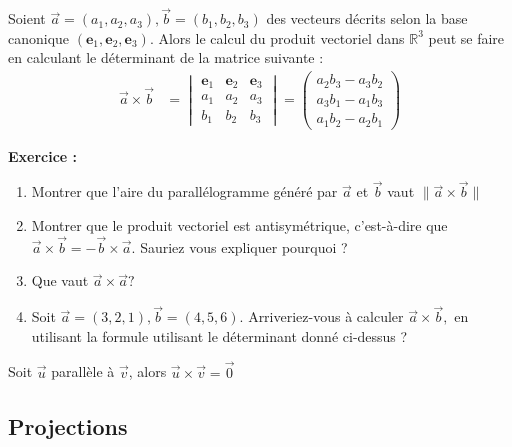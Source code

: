 \documentclass{article}
\begin{document}
\begin{tcolorbox}[title = Calcul du produit vectoriel, enlarge top by=1mm, enlarge bottom by=1mm]
Soient $\Vec{a}=(a_1,a_2,a_3),\Vec{b}=(b_1,b_2,b_3)$ des vecteurs décrits selon la base canonique $(\mathbf{e}_1,\mathbf{e}_2,\mathbf{e}_3).$ Alors le calcul du produit vectoriel dans $\mathbb{R}^3$ peut se faire en calculant le déterminant de la matrice suivante :\begin{align*}
    \vec{a} \times \vec{b}& = \begin{vmatrix}\mathbf{e}_1 & \mathbf{e}_2 & \mathbf{e}_3\\
a_1 & a_2 & a_3\\
b_1 & b_2 & b_3\end{vmatrix}=\begin{pmatrix}
a_2 b_3 - a_3 b_2 \\
a_3 b_1 - a_1 b_3 \\
a_1 b_2 - a_2 b_1
\end{pmatrix}
\end{align*}
 
\end{tcolorbox}


\textbf{Exercice :} 
\begin{enumerate}
    \item Montrer que l'aire du parallélogramme généré par $\vec{a}$ et $\vec{b}$ vaut $\lVert \vec{a} \times \vec{b} \rVert$
    \item Montrer que le produit vectoriel est antisymétrique, c'est-à-dire que $\vec{a} \times \vec{b} = - \vec{b} \times \vec{a}$. Sauriez vous expliquer pourquoi ?
    \item Que vaut $\vec{a} \times \vec{a} ?$
    \item Soit $\Vec{a}=(3,2,1), \Vec{b}=(4,5,6)$. Arriveriez-vous à calculer $\vec{a} \times \vec{b},$ en utilisant la formule utilisant le déterminant donné ci-dessus ?
\end{enumerate}


\begin{tcolorbox}[title = Propriété du produit vectoriel, enlarge top by=1mm, enlarge bottom by=1mm]

Soit $\vec{u}$ parallèle à $\vec{v}$, alors $\vec{u} \times \vec{v} = \vec{0}$
\end{tcolorbox}

\subsection{Projections}
\end{document}

